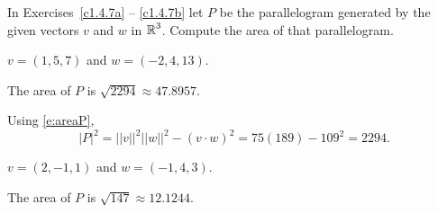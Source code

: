 \documentclass{ximera}
\begin{document}
\noindent In Exercises~\ref{c1.4.7a} -- \ref{c1.4.7b} let $P$ be the 
parallelogram generated by the given vectors $v$ and $w$ in $\mbox{$\Bbb{R}$}^3$.  
Compute the area of that parallelogram.
\begin{computerExercise} \label{c1.4.7a}
$v=(1,5,7)$ and $w=(-2,4,13)$.

\begin{solution}
\ans The area of $P$ is $\sqrt{2294} \approx 47.8957$.

\soln Using \eqref{e:areaP},
\[
|P|^2 = ||v||^2||w||^2 - (v \cdot w)^2 = 75(189) - 109^2 = 2294.
\]

\end{solution}
\end{computerExercise}
\begin{computerExercise} \label{c1.4.7b}
$v=(2,-1,1)$ and $w=(-1,4,3)$.

\begin{solution}
\ans The area of $P$ is $\sqrt{147} \approx 12.1244$.



\end{solution}
\end{computerExercise}
\end{document}
